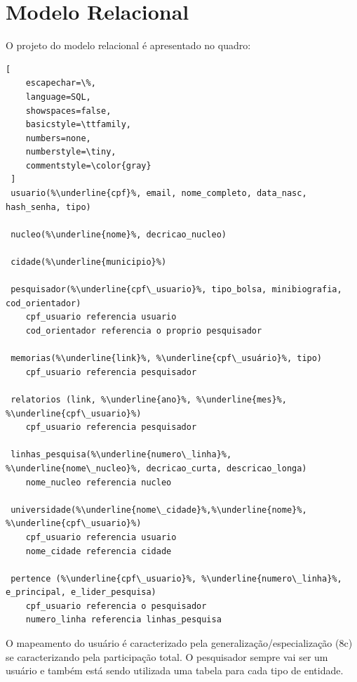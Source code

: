 \documentclass[11pt]{../../classes/ifscarticle}
\begin{document}
\section{Modelo Relacional}
O projeto do modelo relacional é apresentado no quadro:
\begin{lstlisting}[
    escapechar=\%,
    language=SQL,
    showspaces=false,
    basicstyle=\ttfamily,
    numbers=none,
    numberstyle=\tiny,
    commentstyle=\color{gray}
 ]
 usuario(%\underline{cpf}%, email, nome_completo, data_nasc, hash_senha, tipo)

 nucleo(%\underline{nome}%, decricao_nucleo)
 
 cidade(%\underline{municipio}%)

 pesquisador(%\underline{cpf\_usuario}%, tipo_bolsa, minibiografia, cod_orientador)
    cpf_usuario referencia usuario
    cod_orientador referencia o proprio pesquisador

 memorias(%\underline{link}%, %\underline{cpf\_usuário}%, tipo)
    cpf_usuario referencia pesquisador

 relatorios (link, %\underline{ano}%, %\underline{mes}%, %\underline{cpf\_usuario}%)
    cpf_usuario referencia pesquisador

 linhas_pesquisa(%\underline{numero\_linha}%, %\underline{nome\_nucleo}%, decricao_curta, descricao_longa)
    nome_nucleo referencia nucleo

 universidade(%\underline{nome\_cidade}%,%\underline{nome}%, %\underline{cpf\_usuario}%)
    cpf_usuario referencia usuario
    nome_cidade referencia cidade

 pertence (%\underline{cpf\_usuario}%, %\underline{numero\_linha}%, e_principal, e_lider_pesquisa)
    cpf_usuario referencia o pesquisador
    numero_linha referencia linhas_pesquisa
\end{lstlisting}

O mapeamento do usuário é caracterizado pela
generalização/especialização  (8c) se caracterizando pela
participação total. O pesquisador sempre vai ser um usuário
e também está sendo utilizada uma tabela
para cada tipo de entidade. 
\end{document}
